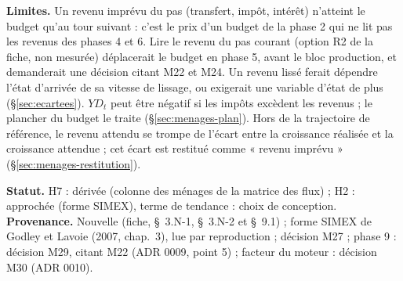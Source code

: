 \documentclass[11pt,a4paper]{article}
\newcommand{\limites}{\par\noindent\textbf{Limites.} }
\begin{document}
\begin{proposee}
\limites Un revenu imprévu du pas (transfert, impôt, intérêt) n'atteint le budget qu'au tour suivant : c'est le prix d'un budget de la phase 2 qui ne lit pas les revenus des phases 4 et 6. Lire le revenu du pas courant (option R2 de la fiche, non mesurée) déplacerait le budget en phase 5, avant le bloc production, et demanderait une décision citant M22 et M24. Un revenu lissé ferait dépendre l'état d'arrivée de sa vitesse de lissage, ou exigerait une variable d'état de plus (\S\ref{sec:ecartees}). $\mathit{YD}_t$ peut être négatif si les impôts excèdent les revenus ; le plancher du budget le traite (\S\ref{sec:menages-plan}). Hors de la trajectoire de référence, le revenu attendu se trompe de l'écart entre la croissance réalisée et la croissance attendue ; cet écart est restitué comme « revenu imprévu » (\S\ref{sec:menages-restitution}).

\textbf{Statut.} H7 : dérivée (colonne des ménages de la matrice des flux) ; H2 : approchée (forme SIMEX), terme de tendance : choix de conception. \textbf{Provenance.} Nouvelle (fiche, \S~3.N-1, \S~3.N-2 et \S~9.1) ; forme SIMEX de Godley et Lavoie (2007, chap.~3), lue par reproduction ; décision M27 ; phase 9 : décision M29, citant M22 (ADR 0009, point 5) ; facteur du moteur : décision M30 (ADR 0010).
\end{proposee}
\end{document}
